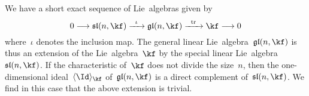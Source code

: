 \begin{example}
	We have a short exact sequence of Lie~algebras given by
	\[
		0
		\to
		\sllie(n, \kf)
		\xto{\iota}
		\gllie(n, \kf)
		\xto{\tr}
		\kf
		\to
		0
	\]
	where~$\iota$ denotes the inclusion map.
	The general linear Lie~algebra~$\gllie(n, \kf)$ is thus an extension of the {\onedimensional} Lie~algebra~$\kf$ by the special linear Lie~algebra~$\sllie(n, \kf)$.
	If the characteristic of~$\kf$ does not divide the size~$n$, then the one-dimensional ideal~$\gen{ \Id }_{\kf}$ of~$\gllie(n, \kf)$ is a direct complement of~$\sllie(n, \kf)$.
	We find in this case that the above extension is trivial.
\end{example}

